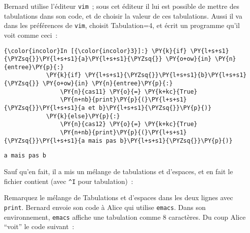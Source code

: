     Bernard utilise l'éditeur \texttt{vim}~; sous cet éditeur il lui est
possible de mettre des tabulations dans son code, et de choisir la
valeur de ces tabulations. Aussi il va dans les préférences de
\texttt{vim}, choisit Tabulation=4, et écrit un programme qu'il voit
comme ceci~:

    \begin{Verbatim}[commandchars=\\\{\},frame=single,framerule=0.3mm,rulecolor=\color{cellframecolor}]
{\color{incolor}In [{\color{incolor}3}]:} \PY{k}{if} \PY{l+s+s1}{\PYZsq{}}\PY{l+s+s1}{a}\PY{l+s+s1}{\PYZsq{}} \PY{o+ow}{in} \PY{n}{entree}\PY{p}{:}
            \PY{k}{if} \PY{l+s+s1}{\PYZsq{}}\PY{l+s+s1}{b}\PY{l+s+s1}{\PYZsq{}} \PY{o+ow}{in} \PY{n}{entree}\PY{p}{:}
                \PY{n}{cas11} \PY{o}{=} \PY{k+kc}{True}
                \PY{n+nb}{print}\PY{p}{(}\PY{l+s+s1}{\PYZsq{}}\PY{l+s+s1}{a et b}\PY{l+s+s1}{\PYZsq{}}\PY{p}{)}
            \PY{k}{else}\PY{p}{:}
                \PY{n}{cas12} \PY{o}{=} \PY{k+kc}{True}
                \PY{n+nb}{print}\PY{p}{(}\PY{l+s+s1}{\PYZsq{}}\PY{l+s+s1}{a mais pas b}\PY{l+s+s1}{\PYZsq{}}\PY{p}{)}
\end{Verbatim}


    \begin{Verbatim}[commandchars=\\\{\},frame=single,framerule=0.3mm,rulecolor=\color{cellframecolor}]
a mais pas b
\end{Verbatim}

    Sauf qu'en fait, il a mis un mélange de tabulations et d'espaces, et en
fait le fichier contient (avec \texttt{\^{}I} pour tabulation)~:

    \begin{Shaded}
\begin{Highlighting}[frame=lines,framerule=0.6mm,rulecolor=\color{asisframecolor}]
  
\OperatorTok{^} 
\OperatorTok{^}\OperatorTok{^}\OperatorTok{=} 
    \OperatorTok{^}\NormalTok{)}
\OperatorTok{^}
\OperatorTok{^}\OperatorTok{^}\OperatorTok{=} 
    \OperatorTok{^}\NormalTok{)}
\end{Highlighting}
\end{Shaded}

    Remarquez le mélange de Tabulations et d'espaces dans les deux lignes
avec \texttt{print}. Bernard envoie son code à Alice qui utilise
\texttt{emacs}. Dans son environnement, \texttt{emacs} affiche une
tabulation comme 8 caractères. Du coup Alice ``voit'' le code suivant~:

